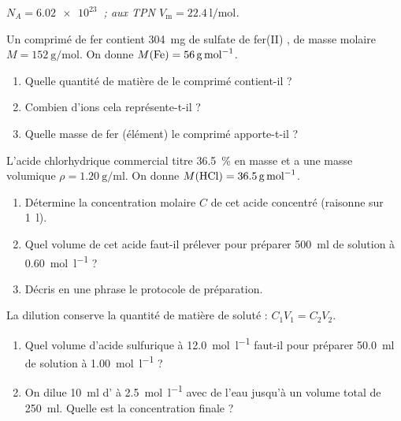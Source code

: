 \documentclass[11pt,a4paper]{article}
\begin{document}
\begin{center}\small\itshape
$N_A=\qty{6.02e23}{}$ ; aux TPN $V_{\mathrm{m}}=\qty{22.4}{\litre\per\mole}$.
\end{center}

\begin{exo}
Un comprimé de fer contient \qty{304}{\milli\gram} de sulfate de fer(II) , de masse molaire
$M=\qty{152}{\gram\per\mole}$. On donne $M(\ce{Fe})=\qty{56}{\gram\per\mole}$.
\begin{enumerate}[label=\alph*)]
  \item Quelle quantité de matière de  le comprimé contient-il ?
  \item Combien d'ions  cela représente-t-il ?
  \item Quelle masse de fer (élément) le comprimé apporte-t-il ?
\end{enumerate}
\end{exo}

\begin{exo}
L'acide chlorhydrique commercial titre \qty{36.5}{\percent} en masse et a une masse volumique
$\rho=\qty{1.20}{\gram\per\milli\litre}$. On donne $M(\ce{HCl})=\qty{36.5}{\gram\per\mole}$.
\begin{enumerate}[label=\alph*)]
  \item Détermine la concentration molaire $C$ de cet acide concentré (raisonne sur \qty{1}{\litre}).
  \item Quel volume de cet acide faut-il prélever pour préparer \qty{500}{\milli\litre} de solution
        à \qty{0.60}{\mole\per\litre} ?
  \item Décris en une phrase le protocole de préparation.
\end{enumerate}
\end{exo}

\begin{exo}[dilutions]
La dilution conserve la quantité de matière de soluté : $C_1V_1=C_2V_2$.
\begin{enumerate}[label=\alph*)]
  \item Quel volume d'acide sulfurique à \qty{12.0}{\mole\per\litre} faut-il pour préparer
        \qty{50.0}{\milli\litre} de solution à \qty{1.00}{\mole\per\litre} ?
  \item On dilue \qty{10}{\milli\litre} d' à \qty{2.5}{\mole\per\litre} avec de l'eau jusqu'à
        un volume total de \qty{250}{\milli\litre}. Quelle est la concentration finale ?
\end{enumerate}
\end{exo}
\end{document}
